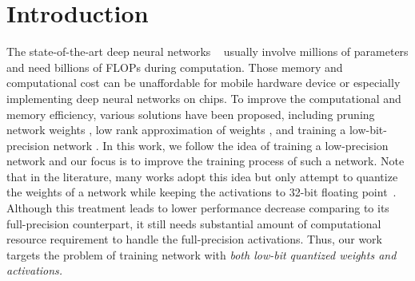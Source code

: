 \section{Introduction}
The state-of-the-art deep neural networks ~\cite{krizhevsky2012imagenet, simonyan2014very, he2016deep} usually involve millions of parameters and need billions of FLOPs during computation. Those memory and computational cost can be unaffordable for mobile hardware device or especially implementing deep neural networks on chips. To improve the computational and memory efficiency, various solutions have been proposed, including pruning network weights \cite{han2015learning, han2015deep}, low rank approximation of weights \cite{kim2015compression, zhang2016accelerating}, and training a low-bit-precision network \cite{zhou2017incremental, courbariaux2015binaryconnect, zhu2016trained, zhou2016dorefa}. In this work, we follow the idea of training a low-precision network and our focus is to improve the training process of such a network. Note that in the literature, many works adopt this idea but only attempt to quantize the weights of a network while keeping the activations to 32-bit floating point~\cite{zhou2017incremental, courbariaux2015binaryconnect, zhu2016trained}. Although this treatment leads to lower performance decrease comparing to its full-precision counterpart, it still needs substantial amount of computational resource requirement to handle the full-precision activations. Thus, our work targets the problem of training network with \textit{both low-bit quantized weights and activations.}


